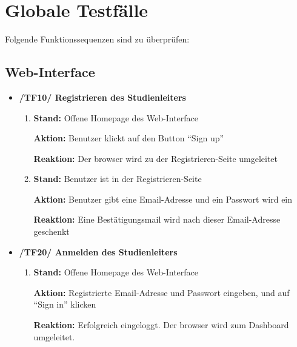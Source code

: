 \documentclass[a4paper]{scrreprt}
\begin{document}
    \chapter{Globale Testfälle}

        Folgende Funktionssequenzen sind zu \"uberpr\"ufen:

        \section{Web-Interface}

            \begin{itemize}
                \item \textbf{/TF10/ Registrieren des \gls{Studienleiter}s}
                    \begin{enumerate}
                        \item \par \textbf{Stand: }Offene Homepage des \gls{Web-Interface}
                            \par \textbf{Aktion: }Benutzer klickt auf den Button ``Sign up''
                            \par \textbf{Reaktion: }Der browser wird zu der Registrieren-Seite umgeleitet
                        \item \par \textbf{Stand: }Benutzer ist in der Registrieren-Seite
                             \par \textbf{Aktion: }Benutzer gibt eine Email-Adresse und ein Passwort wird ein
                             \par \textbf{Reaktion: }Eine Bestätigungsmail wird nach dieser Email-Adresse geschenkt
                   \end{enumerate}

                    \item \textbf{/TF20/ Anmelden des \gls{Studienleiter}s}
                        \begin{enumerate}
                            \item \par \textbf{Stand: }Offene Homepage des \gls{Web-Interface}
                                \par \textbf{Aktion: }Registrierte Email-Adresse und Passwort eingeben, und auf “Sign in” klicken
                                \par \textbf{Reaktion: }Erfolgreich eingeloggt. Der browser wird zum Dashboard umgeleitet.
                        \end{enumerate}


\end{itemize}
\end{document}
